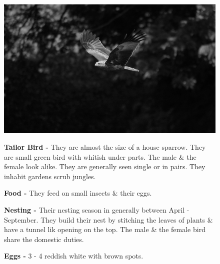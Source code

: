 \begin{figure}[H]
\begin{center}
\includegraphics{figure/Land_birds/01_pariah_kite/pariah-kite.eps}
\end{center}
\medskip
\noindent
{\bf Tailor Bird -} They are almost the size of a house sparrow. They are small green bird with whitish under parts. The male \& the female look alike. They are generally seen single or in pairs. They inhabit gardens scrub jungles.

\medskip
{\bf Food -} They feed on small insects \& their eggs.

{\bf Nesting -} Their nesting season in generally between April - September. They build their nest by stitching the leaves of plants \& have a tunnel lik opening on the top. The male \& the female bird share the domestic duties.

{\bf Eggs -} 3 - 4 reddish white with brown spots.
\end{figure}

\vfill\eject

~\phantom{a}
\vfill


